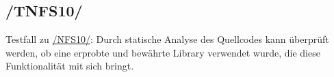 \subsection*{/TNFS10/}
\label{/TNFS10/} Testfall zu \hyperref[/NFS10/]{/NFS10/}: Durch \gls{statische Analyse} des \Gls{Quellcode}s kann überprüft werden, ob eine erprobte und bewährte \Gls{Library} verwendet wurde,
die diese Funktionalität mit sich bringt.